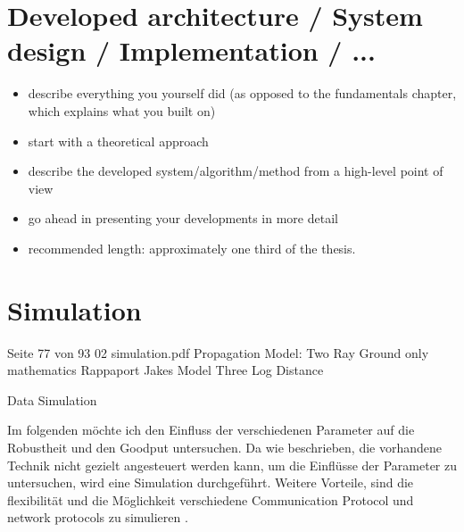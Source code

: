 \documentclass[]{nsm-thesis}
\begin{document}

\chapter{Developed architecture / System design / Implementation / ...}


\begin{itemize}
\item describe everything you yourself did (as opposed to the fundamentals chapter, which explains what you built on)
\item start with a theoretical approach
\item describe the developed system/algorithm/method from a high-level point of view
\item go ahead in presenting your developments in more detail
\item recommended length: approximately one third of the thesis.
\end{itemize}

\chapter{Simulation}
Seite 77 von 93 02 simulation.pdf
Propagation Model:
 Two Ray Ground only mathematics Rappaport
 Jakes Model
 Three Log Distance
 
 
 Data Simulation
 
 
 

Im folgenden möchte ich den Einfluss der verschiedenen Parameter auf die Robustheit und den Goodput untersuchen. Da wie beschrieben, die vorhandene Technik nicht
gezielt angesteuert werden kann, um die Einflüsse der Parameter zu untersuchen, wird eine Simulation durchgeführt. Weitere Vorteile, sind die flexibilität und die
Möglichkeit verschiedene Communication Protocol und network protocols zu simulieren \cite{ComparativeStudyKumar}.
\end{document}
